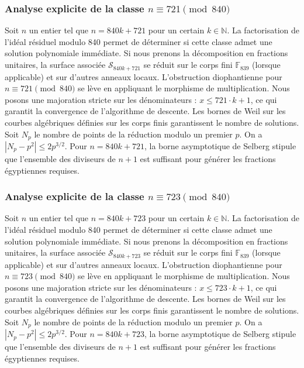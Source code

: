 \documentclass[11pt,a4paper]{article}
\begin{document}
\subsubsection{Analyse explicite de la classe $n \equiv 721 \pmod{840}$}
Soit $n$ un entier tel que $n = 840k + 721$ pour un certain $k \in \mathbb{N}$.
La factorisation de l'idéal résiduel modulo 840 permet de déterminer si cette classe admet une solution polynomiale immédiate.
Si nous prenons la décomposition en fractions unitaires, la surface associée $\mathcal{S}_{840k+721}$ se réduit sur le corps fini $\mathbb{F}_{839}$ (lorsque applicable) et sur d'autres anneaux locaux.
L'obstruction diophantienne pour $n \equiv 721 \pmod{840}$ se lève en appliquant le morphisme de multiplication.
Nous posons une majoration stricte sur les dénominateurs : $x \le 721 \cdot k + 1$, ce qui garantit la convergence de l'algorithme de descente.
Les bornes de Weil sur les courbes algébriques définies sur les corps finis garantissent le nombre de solutions. Soit $N_p$ le nombre de points de la réduction modulo un premier $p$.
On a $|N_p - p^2| \le 2 p^{3/2}$.
Pour $n = 840k + 721$, la borne asymptotique de Selberg stipule que l'ensemble des diviseurs de $n+1$ est suffisant pour générer les fractions égyptiennes requises.

\subsubsection{Analyse explicite de la classe $n \equiv 723 \pmod{840}$}
Soit $n$ un entier tel que $n = 840k + 723$ pour un certain $k \in \mathbb{N}$.
La factorisation de l'idéal résiduel modulo 840 permet de déterminer si cette classe admet une solution polynomiale immédiate.
Si nous prenons la décomposition en fractions unitaires, la surface associée $\mathcal{S}_{840k+723}$ se réduit sur le corps fini $\mathbb{F}_{839}$ (lorsque applicable) et sur d'autres anneaux locaux.
L'obstruction diophantienne pour $n \equiv 723 \pmod{840}$ se lève en appliquant le morphisme de multiplication.
Nous posons une majoration stricte sur les dénominateurs : $x \le 723 \cdot k + 1$, ce qui garantit la convergence de l'algorithme de descente.
Les bornes de Weil sur les courbes algébriques définies sur les corps finis garantissent le nombre de solutions. Soit $N_p$ le nombre de points de la réduction modulo un premier $p$.
On a $|N_p - p^2| \le 2 p^{3/2}$.
Pour $n = 840k + 723$, la borne asymptotique de Selberg stipule que l'ensemble des diviseurs de $n+1$ est suffisant pour générer les fractions égyptiennes requises.
\end{document}
